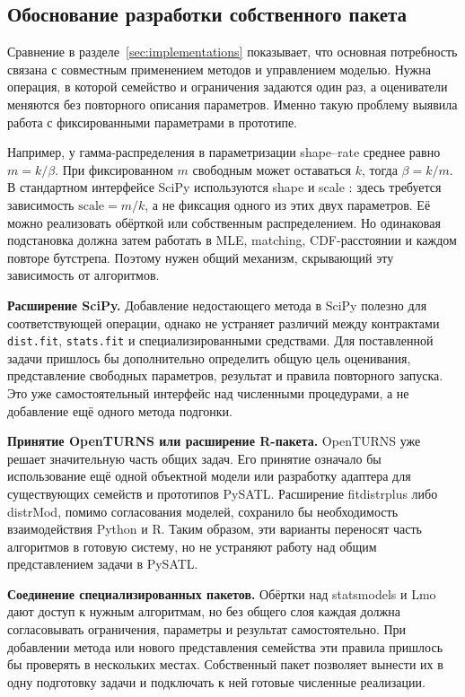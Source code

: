 \subsection{Обоснование разработки собственного пакета}
Сравнение в разделе~\ref{sec:implementations} показывает, что основная
потребность связана с совместным применением методов и управлением
моделью. Нужна операция, в которой семейство и ограничения задаются
один раз, а оцениватели меняются без повторного описания параметров.
Именно такую проблему выявила работа с фиксированными параметрами
в прототипе.

Например, у гамма-распределения в параметризации shape--rate
среднее равно $m=k/\beta$. При фиксированном $m$ свободным может оставаться
$k$, тогда $\beta=k/m$. В стандартном интерфейсе SciPy используются
shape и scale \cite{reviewScipyGamma}: здесь требуется зависимость
$\mathrm{scale}=m/k$, а не фиксация одного из этих двух параметров.
Её можно реализовать обёрткой или собственным распределением.
Но одинаковая подстановка должна затем работать в MLE, matching,
CDF-расстоянии и каждом повторе бутстрепа. Поэтому нужен общий механизм,
скрывающий эту зависимость от алгоритмов.

\textbf{Расширение SciPy.}
Добавление недостающего метода в SciPy полезно для соответствующей
операции, однако не устраняет различий между контрактами
\texttt{dist.fit}, \texttt{stats.fit} и специализированными средствами.
Для поставленной задачи пришлось бы дополнительно определить общую
цель оценивания, представление свободных параметров, результат и
правила повторного запуска. Это уже самостоятельный интерфейс над
численными процедурами, а не добавление ещё одного метода подгонки.

\textbf{Принятие OpenTURNS или расширение R-пакета.}
OpenTURNS уже решает значительную часть общих задач. Его принятие
означало бы использование ещё одной объектной модели или разработку
адаптера для существующих семейств и прототипов PySATL.
Расширение fitdistrplus либо distrMod, помимо согласования моделей,
сохранило бы необходимость взаимодействия Python и R.
Таким образом, эти варианты переносят часть алгоритмов в готовую систему,
но не устраняют работу над общим представлением задачи в PySATL.

\textbf{Соединение специализированных пакетов.}
Обёртки над statsmodels и Lmo дают доступ к нужным алгоритмам,
но без общего слоя каждая должна согласовывать ограничения, параметры
и результат самостоятельно. При добавлении метода или нового
представления семейства эти правила пришлось бы проверять в нескольких
местах. Собственный пакет позволяет вынести их в одну подготовку задачи
и подключать к ней готовые численные реализации.

